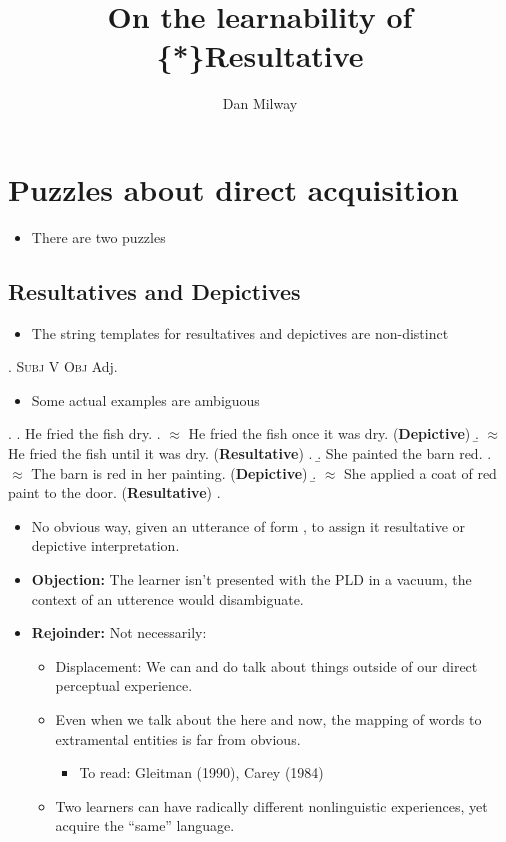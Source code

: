 \documentclass[letterpaper]{article}
\title{On the learnability of \{*\}Resultative}
\author{Dan Milway}
\begin{document}
\maketitle
\section{Puzzles about direct acquisition}
\begin{itemize}
  \item There are two puzzles
\end{itemize}
\subsection{Resultatives and Depictives}
\begin{itemize}
  \item The string templates for resultatives and depictives are non-distinct
\end{itemize}
\ex. \textsc{Subj} V \textsc{Obj} Adj.

\begin{itemize}
  \item Some actual examples are ambiguous
\end{itemize}
\ex. 
\a. He fried the fish dry.
\a. $\approx$ He fried the fish once it was dry. (\textbf{Depictive})
\b. $\approx$ He fried the fish until it was dry. (\textbf{Resultative})
\z.
\b. She painted the barn red.
\a. $\approx$ The barn is red in her painting. (\textbf{Depictive})
\b. $\approx$ She applied a coat of red paint to the door. (\textbf{Resultative})
\z.

\begin{itemize}
  \item No obvious way, given an utterance of form \LLast, to assign it resultative or depictive interpretation.
  \item \textbf{Objection:} The learner isn't presented with the PLD in a vacuum, the context of an utterence would disambiguate.
  \item \textbf{Rejoinder:} Not necessarily:
    \begin{itemize}
      \item Displacement: We can and do talk about things outside of our direct perceptual experience.
      \item Even when we talk about the here and now, the mapping of words to extramental entities is far from obvious.
	\begin{itemize}
	  \item To read: Gleitman (1990), Carey (1984)
	\end{itemize}
      \item Two learners can have radically different nonlinguistic experiences, yet acquire the ``same'' language.
    \end{itemize}
\end{itemize}
\end{document}
